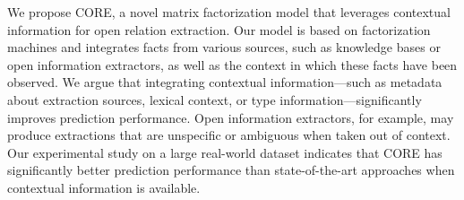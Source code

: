 We propose CORE, a novel matrix factorization model that leverages contextual information for open relation extraction. Our model is based on factorization machines and integrates facts from various sources, such as knowledge bases or open information extractors, as well as the context in which these facts have been observed. We argue that integrating contextual information---such as metadata about extraction sources, lexical context, or type information---significantly improves prediction performance. Open information extractors, for example, may produce extractions that are unspecific or ambiguous when taken out of context. Our experimental study on a large real-world dataset indicates that CORE has significantly better prediction performance than state-of-the-art approaches when contextual information is available.
